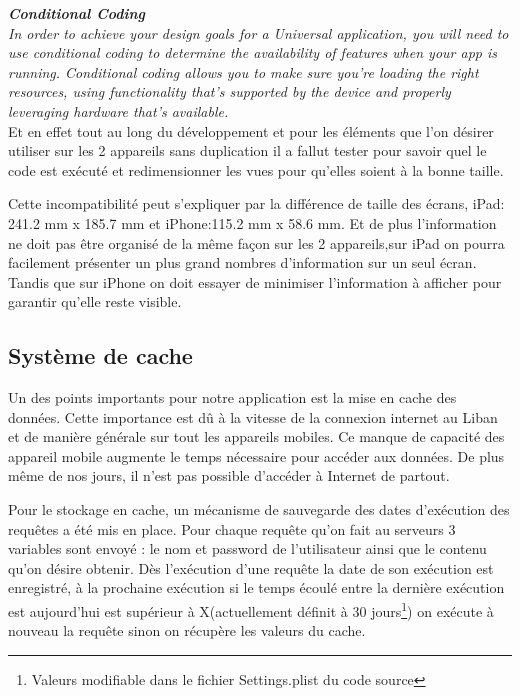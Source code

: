 	 \textit{\textbf{Conditional Coding}\\
	In order to achieve your design goals for a Universal application, you will need to use conditional coding to determine the availability of features when your app is running. Conditional coding allows you to make sure you're loading the right resources, using functionality that's supported by the device and properly leveraging hardware that's available.}\\
	
	Et en effet tout au long du développement et pour les éléments que l'on désirer utiliser sur les 2 appareils sans duplication il a fallut tester pour savoir quel
	le code est exécuté et redimensionner les vues pour qu'elles soient à la bonne taille. 
	
	 Cette incompatibilité peut s'expliquer par la différence de taille des écrans, iPad: 241.2 mm x 185.7 mm et iPhone:115.2 mm x 58.6 mm. Et de plus l'information ne doit pas être organisé de la même façon sur les 2 appareils,sur iPad on pourra facilement présenter un plus grand nombres d'information sur un seul écran. Tandis que sur iPhone on doit essayer de minimiser l'information à afficher pour garantir qu'elle reste visible.
	 
	\subsection{Système de cache \label{sCache} }
		Un des points importants pour notre application est la mise en cache des données. Cette importance est dû à la vitesse de la connexion internet au Liban et de manière générale sur  tout les appareils mobiles. Ce manque de capacité des appareil mobile augmente le temps nécessaire pour accéder aux données. De plus même de nos jours, il n'est pas possible d'accéder à Internet de partout. 
		
		Pour le stockage en cache, un mécanisme de sauvegarde des dates d'exécution des requêtes a été mis en place. Pour chaque requête qu'on fait au serveurs 3 variables sont envoyé : le nom et password de l'utilisateur ainsi que le contenu qu'on désire obtenir. Dès l'exécution d'une requête la date de son exécution est enregistré, à la prochaine exécution si le temps écoulé entre la dernière exécution est aujourd'hui est supérieur à X(actuellement définit à 30 jours\footnote{Valeurs modifiable dans le fichier Settings.plist du code source}) on exécute à nouveau la requête sinon on récupère les valeurs du cache.

		
